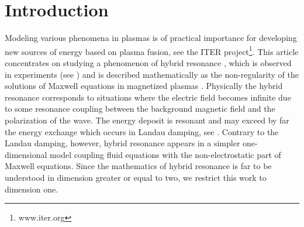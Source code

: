 \section{Introduction}
Modeling various phenomena in plasmas is of practical importance for developing new sources of energy 
based on plasma fusion, see the ITER project\footnote{www.iter.org}. 
This article concentrates on studying a phenomenon of hybrid resonance \cite{Stix}, 
which is observed in experiments (see \cite{reflectometers_2006, reflectometers_2010, Dumont_2005}) and is described
mathematically as the non-regularity of
the solutions of Maxwell equations in magnetized plasmas \cite{Despres_2014}. 
Physically the hybrid resonance corresponds to situations where the electric field becomes
infinite due to some resonance coupling between the background magnetic field and
the polarization of the wave.
The energy deposit is resonant and may exceed by far the energy 
exchange which occurs in Landau damping, see \cite{Freidberg_2007}. 
Contrary to the Landau damping, however, 
hybrid resonance appears in a simpler one-dimensional  model coupling 
fluid equations with the non-electrostatic part of Maxwell equations.
Since  the mathematics of hybrid resonance is far to be understood
in dimension greater or equal to two, we restrict this work to dimension one.

